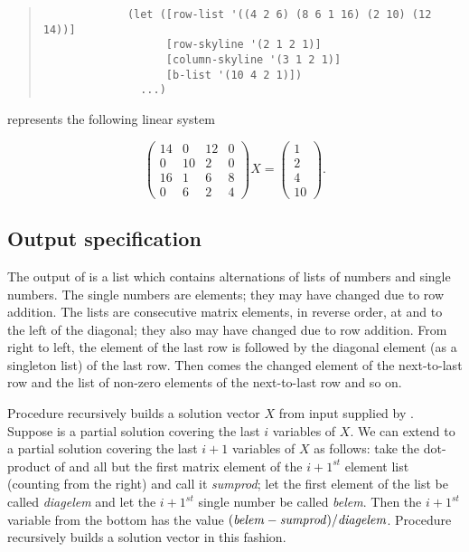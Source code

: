 \begin{quote}
\begin{verbatim}
             (let ([row-list '((4 2 6) (8 6 1 16) (2 10) (12 14))]
                   [row-skyline '(2 1 2 1)]
                   [column-skyline '(3 1 2 1)]
                   [b-list '(10 4 2 1)])
               ...)
\end{verbatim}
\end{quote}

\noindent
represents the following linear system

\[ \left(\begin{array}{cccc} 14 & 0 & 12 & 0 \\ 0 & 10 & 2 & 0 \\
   16 & 1 & 6 & 8 \\ 0 & 6 & 2 & 4 \end{array} \right)X = \left(
   \begin{array}{c} 1 \\ 2 \\ 4 \\ 10 \end{array} \right). \]

\subsection{Output specification}

The output of  is a list which contains alternations of
lists of numbers and single numbers.  The single numbers are 
elements;  they may have changed due to row addition.  The lists are
consecutive matrix elements, in reverse order, at and to the left of the
diagonal; they also may have changed due to row addition.  From right to left,
the  element of the last row is followed by the diagonal element
(as a singleton list) of the last row.  Then comes the changed 
element of the next-to-last row and the list of non-zero elements of the
next-to-last row and so on.

Procedure  recursively builds a solution vector $X$ from input
supplied by .  Suppose  is a partial
solution covering the last $i$ variables of $X$.  We can extend  to a
partial solution covering the last $i+1$ variables of $X$ as follows:  take
the dot-product of  and all but the first matrix element of the
$i+1^{st}$ element list (counting from the right) and call it
{\it sumprod}; let the first element of the list be called
{\it diagelem} and let the $i+1^{st}$ single number be called {\it belem}.
Then the $i+1^{st}$ variable from the bottom has the value
$({\it belem} - {\it sumprod})/{\it diagelem}$.  Procedure 
recursively builds a solution vector in this fashion.


